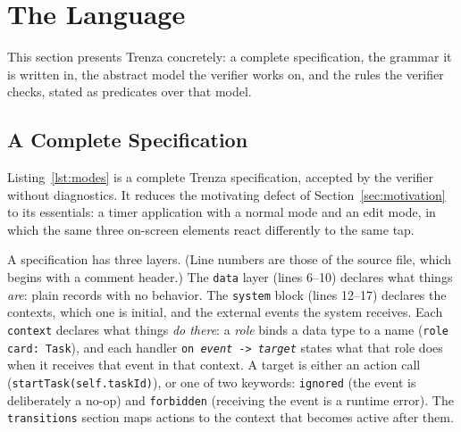 %
%
%

\section{The Language}
\label{sec:language}

This section presents Trenza concretely: a complete specification, the
grammar it is written in, the abstract model the verifier works on, and the
rules the verifier checks, stated as predicates over that model.

\subsection{A Complete Specification}
\label{sec:example}

Listing~\ref{lst:modes} is a complete Trenza specification, accepted by the
verifier without diagnostics. It reduces the motivating defect of
Section~\ref{sec:motivation} to its essentials: a timer application with a
normal mode and an edit mode, in which the same three on-screen elements
react differently to the same tap.



A specification has three layers. (Line numbers are those of the source
file, which begins with a comment header.) The \texttt{data} layer (lines 6--10)
declares what things \emph{are}: plain records with no behavior. The
\texttt{system} block (lines 12--17) declares the contexts, which one is
initial, and the external events the system receives. Each \texttt{context}
declares what things \emph{do there}: a \emph{role} binds a data type to a
name (\texttt{role card: Task}), and each handler
\texttt{on \emph{event} -> \emph{target}} states what that role does when it
receives that event in that context. A target is either an action call
(\texttt{startTask(self.taskId)}), or one of two keywords:
\texttt{ignored} (the event is deliberately a no-op) and \texttt{forbidden}
(receiving the event is a runtime error). The \texttt{transitions} section
maps actions to the context that becomes active after them.

